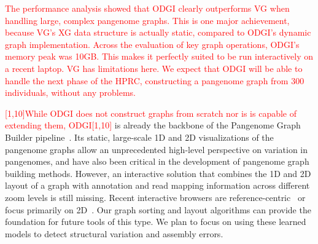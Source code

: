 \documentclass{bioinfo}
\newcommand{\REVIEWED}[1]{{\textcolor{Red}{#1}}}
\begin{document}
\REVIEWED{The performance analysis showed that ODGI clearly outperforms VG when handling large, complex pangenome graphs. This is one major achievement, because VG's XG data structure is actually static, compared to ODGI's dynamic graph implementation. Across the evaluation of key graph operations, ODGI's memory peak was 10GB. This makes it perfectly suited to be run interactively on a recent laptop. VG has limitations here. We expect that ODGI will be able to handle the next phase of the HPRC, constructing a pangenome graph from 300 individuals, without any problems.}

\REVIEWED{[1,10]While ODGI does not construct graphs from scratch nor is is capable of extending them, ODGI[1,10]} is already the backbone of the Pangenome Graph Builder pipeline~\citep{pggb}.
Its static, large-scale 1D and 2D visualizations of the pangenome graphs allow an unprecedented high-level perspective on variation in pangenomes, and have also been critical in the development of pangenome graph building methods.  %
However, an interactive solution that combines the 1D and 2D layout of a graph with annotation and read mapping information across different zoom levels is still missing.
Recent interactive browsers are reference-centric~\citep{Beyer2019, Yokoyama2019, Durant2021, Liang2021} or focus primarily on 2D~\citep{Wick_2015, Gonnella2018}.
Our graph sorting and layout algorithms can provide the foundation for future tools of this type.
We plan to focus on using these learned models to detect structural variation and assembly errors.
\end{document}
